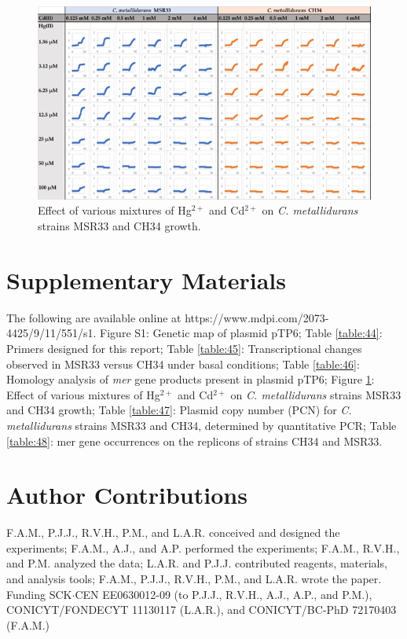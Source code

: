 \begin{figure} [ht] 
\begin{center}
\hspace*{-1.5cm}
\includegraphics[width=500px]{chapter3/chapter/figs/genes-09-00551-g004.png}
\end{center}
\caption{Effect of various mixtures of Hg$^{2+}$ and Cd$^{2+}$  on \textit{C. metallidurans} strains MSR33 and CH34 growth.   
}
\label{chapter3-fig4}%
\end{figure}

\section{Supplementary Materials}

The following are available online at https://www.mdpi.com/2073-4425/9/11/551/s1. Figure S1: Genetic map of plasmid pTP6; Table \ref{table:44}: Primers designed for this report; Table \ref{table:45}: Transcriptional changes observed in MSR33 versus CH34 under basal conditions; Table \ref{table:46}: Homology analysis of \textit{mer} gene products present in plasmid pTP6; Figure \ref{chapter3-fig4}: Effect of various mixtures of Hg$^{2+}$ and Cd$^{2+}$ on \textit{C. metallidurans} strains MSR33 and CH34 growth; Table \ref{table:47}: Plasmid copy number (PCN) for \textit{C. metallidurans} strains MSR33 and CH34, determined by quantitative PCR; Table \ref{table:48}: mer gene occurrences on the replicons of strains CH34 and MSR33.

\section{Author Contributions}

F.A.M., P.J.J., R.V.H., P.M., and L.A.R. conceived and designed the experiments; F.A.M., A.J., and A.P. performed the experiments; F.A.M., R.V.H., and P.M. analyzed the data; L.A.R. and P.J.J. contributed reagents, materials, and analysis tools; F.A.M., P.J.J., R.V.H., P.M., and L.A.R. wrote the paper.
Funding
SCK$\cdot$CEN EE0630012-09 (to P.J.J., R.V.H., A.J., A.P., and P.M.), CONICYT/FONDECYT 11130117 (L.A.R.), and CONICYT/BC-PhD 72170403 (F.A.M.)

